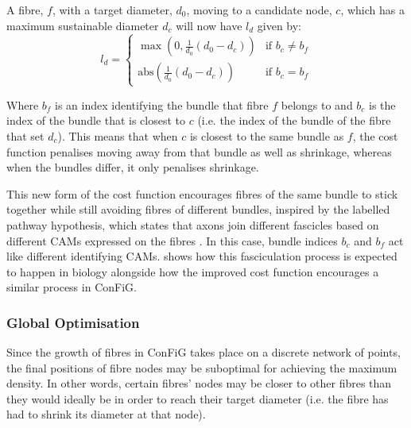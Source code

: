 A fibre, $f$, with a target diameter, $d_0$, moving to a candidate node, $c$, which has a maximum sustainable diameter $d_c$ will now have $l_d$ given by:
\begin{equation}
  \label{eq:updated_ld}
  l_d = \begin{cases}
    \max\left(0, \frac{1}{d_0} \left(d_0 - d_c\right)\right) & \text{if } b_c \neq b_f \\
    \mathrm{abs}\left(\frac{1}{d_0} \left(d_0 - d_c\right)\right) & \text{if } b_c = b_f
    \end{cases}
\end{equation}

Where $b_f$ is an index identifying the bundle that fibre $f$ belongs to and $b_c$ is the index of the bundle that is closest to $c$ (i.e. the index of the bundle of the fibre that set $d_c$). This means that when $c$ is closest to the same bundle as $f$, the cost function penalises moving away from that bundle as well as shrinkage, whereas when the bundles differ, it only penalises shrinkage.

This new form of the cost function encourages fibres of the same bundle to stick together while still avoiding fibres of different bundles, inspired by the labelled pathway hypothesis, which states that axons join different fascicles based on different \acp{CAM} expressed on the fibres \cite{Price2017}. In this case, bundle indices $b_c$ and $b_f$ act like different identifying \acp{CAM}.  shows how this fasciculation process is expected to happen in biology alongside how the improved cost function encourages a similar process in \ac{ConFiG}.

\subsubsection{Global Optimisation}
\label{sec:config_global_optimisation}
Since the growth of fibres in \ac{ConFiG} takes place on a discrete network of points, the final positions of fibre nodes may be suboptimal for achieving the maximum density. In other words, certain fibres’ nodes may be closer to other fibres than they would ideally be in order to reach their target diameter (i.e. the fibre has had to shrink its diameter at that node).

